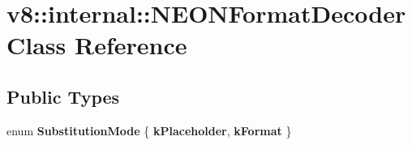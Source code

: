 \hypertarget{classv8_1_1internal_1_1NEONFormatDecoder}{}\section{v8\+:\+:internal\+:\+:N\+E\+O\+N\+Format\+Decoder Class Reference}
\label{classv8_1_1internal_1_1NEONFormatDecoder}
\subsection*{Public Types}
\begin{DoxyCompactItemize}
\item 
\mbox{\label{classv8_1_1internal_1_1NEONFormatDecoder_a5f3240a2f6ba9d123763017adf55e3fd}} 
enum {\bfseries Substitution\+Mode} \{ {\bfseries k\+Placeholder}, 
{\bfseries k\+Format}
 \}
\end{DoxyCompactItemize}
